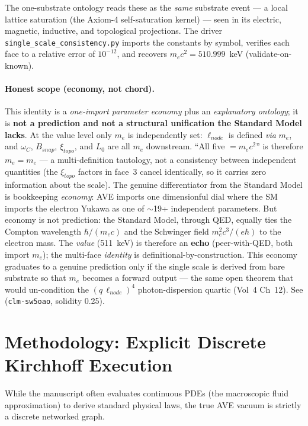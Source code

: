 The one-substrate ontology reads these as the \emph{same} substrate event --- a local lattice saturation (the Axiom-4 self-saturation kernel) --- seen in its electric, magnetic, inductive, and topological projections. The driver \texttt{single\_scale\_consistency.py} imports the constants by symbol, verifies each face to a relative error of $10^{-12}$, and recovers $m_e c^2 = 510.999$~keV (validate-on-known).

\paragraph{Honest scope (economy, not chord).} This identity is a \emph{one-import parameter economy} plus an \emph{explanatory ontology}; it is \textbf{not a prediction and not a structural unification the Standard Model lacks}. At the value level only $m_e$ is independently set: $\ell_{node}$ is defined \emph{via} $m_e$, and $\omega_C$, $B_{snap}$, $\xi_{topo}$, and $L_0$ are all $m_e$ downstream. ``All five $= m_e c^2$'' is therefore $m_e = m_e$ --- a multi-definition tautology, not a consistency between independent quantities (the $\xi_{topo}$ factors in face~3 cancel identically, so it carries zero information about the scale). The genuine differentiator from the Standard Model is bookkeeping \emph{economy}: AVE imports one dimensionful dial where the SM imports the electron Yukawa as one of $\sim$19+ independent parameters. But economy is not prediction: the Standard Model, through QED, equally ties the Compton wavelength $\hbar/(m_e c)$ and the Schwinger field $m_e^2 c^3/(e\hbar)$ to the electron mass. The \emph{value} (511~keV) is therefore an \textbf{echo} (peer-with-QED, both import $m_e$); the multi-face \emph{identity} is definitional-by-construction. This economy graduates to a genuine prediction only if the single scale is derived from bare substrate so that $m_e$ becomes a forward output --- the same open theorem that would un-condition the $(q\,\ell_{node})^4$ photon-dispersion quartic (Vol~4 Ch~12). See  (\texttt{clm-sw5oao}, solidity 0.25).

\section{Methodology: Explicit Discrete Kirchhoff Execution}
While the manuscript often evaluates continuous PDEs (the macroscopic fluid approximation) to derive standard physical laws, the true AVE vacuum is strictly a discrete networked graph. 

